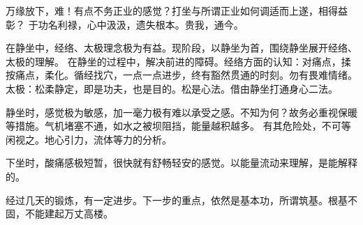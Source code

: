 万缘放下，难！有点不务正业的感觉？打坐与所谓正业如何调适而上遂，相得益彰？
于功名利禄，心中汲汲，遗失根本。贵我，通今。

在静坐中，经络、太极理念极为有益。现阶段，以静坐为首，围绕静坐展开经络、太极的理解。
在静坐的过程中，解决前进的障碍。经络方面的认知：对痛点，揉按痛点，柔化。循经找穴，一点一点进步，终有豁然贯通的时刻。勿有畏难情绪。
太极：松柔静定，即是功夫，也是目的。松是心法。借由静坐打通身心二法。

静坐时，感觉极为敏感，加一毫力极有难以承受之感。不知为何？故务必重视保暖等措施。气机堵塞不通，如水之被坝阻挡，能量越积越多。
有其危险处，不可等闲视之。地心引力，流体等力的分析。

下坐时，酸痛感极短暂，很快就有舒畅轻安的感觉。以能量流动来理解，是能解释的。

经过几天的锻炼，有一定进步。下一步的重点，依然是基本功，所谓筑基。根基不固，不能建起万丈高楼。
